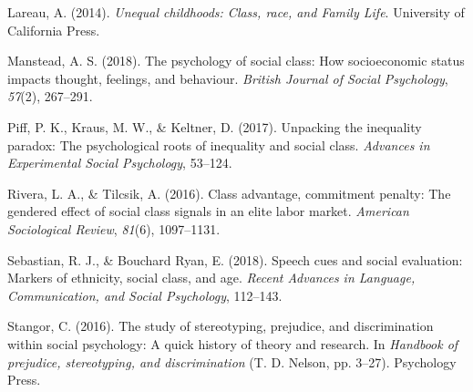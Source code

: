 \documentclass[
  man,floatsintext]{apa6}
\newlength{\cslhangindent}
\newlength{\cslentryspacingunit} %
\newenvironment{CSLReferences}[2] %
 {%
  \setlength{\parindent}{0pt}
  \ifodd #1
  \let\oldpar\par
  \def\par{\hangindent=\cslhangindent\oldpar}
  \fi
  \setlength{\parskip}{#2\cslentryspacingunit}
 }%
 {}
\begin{document}
\begin{CSLReferences}{1}{0}
\leavevmode{}%
Lareau, A. (2014). \emph{Unequal childhoods: {Class}, race, and {Family Life}}. {University of California Press}.

\leavevmode{}%
Manstead, A. S. (2018). The psychology of social class: {How} socioeconomic status impacts thought, feelings, and behaviour. \emph{British Journal of Social Psychology}, \emph{57}(2), 267--291.

\leavevmode{}%
Piff, P. K., Kraus, M. W., \& Keltner, D. (2017). Unpacking the inequality paradox: {The} psychological roots of inequality and social class. \emph{Advances in Experimental Social Psychology}, 53--124.

\leavevmode{}%
Rivera, L. A., \& Tilcsik, A. (2016). Class advantage, commitment penalty: {The} gendered effect of social class signals in an elite labor market. \emph{American Sociological Review}, \emph{81}(6), 1097--1131.

\leavevmode{}%
Sebastian, R. J., \& Bouchard Ryan, E. (2018). Speech cues and social evaluation: {Markers} of ethnicity, social class, and age. \emph{Recent Advances in Language, Communication, and Social Psychology}, 112--143.

\leavevmode{}%
Stangor, C. (2016). The study of stereotyping, prejudice, and discrimination within social psychology: {A} quick history of theory and research. In \emph{Handbook of prejudice, stereotyping, and discrimination} (T. D. Nelson, pp. 3--27). {Psychology Press}.

\end{CSLReferences}

\endgroup
\end{document}
